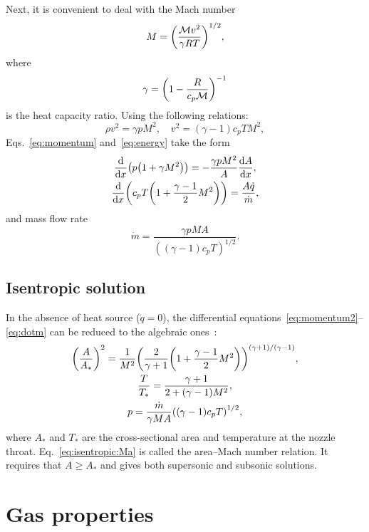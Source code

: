 \documentclass{article}
\begin{document}
Next, it is convenient to deal with the Mach number
\begin{equation}\label{eq:Mach}
    M = \qty(\frac{\mathcal{M}v^2}{\gamma RT})^{1/2},
\end{equation}
where
\begin{equation}\label{eq:gamma}
    \gamma = \qty(1-\frac{R}{c_p\mathcal{M}})^{-1}
\end{equation}
is the heat capacity ratio.
Using the following relations:
\begin{equation*}
    \rho v^2 = \gamma p M^2, \quad v^2 = (\gamma-1)c_pT M^2,
\end{equation*}
Eqs.~\eqref{eq:momentum} and~\eqref{eq:energy} take the form
\begin{gather}
    \dv{x}(p\qty(1 + \gamma M^2)) = -\frac{\gamma p M^2}{A}\dv{A}{x}, \label{eq:momentum2}\\
    \dv{x}(c_pT\qty(1 + \frac{\gamma-1}{2}M^2)) = \frac{A\dot{q}}{\dot{m}}, \label{eq:energy2}
\end{gather}
and mass flow rate
\begin{equation}\label{eq:dotm}
    \dot{m} = \frac{\gamma pMA}{((\gamma-1)c_pT)^{1/2}}.
\end{equation}

\subsection{Isentropic solution}

In the absence of heat source ($\dot{q}=0$), the differential equations~\eqref{eq:momentum2}--\eqref{eq:dotm}
can be reduced to the algebraic ones~\cite[Sec.~5.4]{anderson1990modern}:
\begin{gather}
    \qty(\frac{A}{A_*})^2 = \frac1{M^2}
        \qty(\frac{2}{\gamma+1}\qty(1+\frac{\gamma-1}{2}M^2))^{(\gamma+1)/(\gamma-1)}, \label{eq:isentropic:Ma}\\
    \frac{T}{T_*} = \frac{\gamma+1}{2 + (\gamma-1)M^2}, \label{eq:isentropic:T}\\
    p = \frac{\dot{m}}{\gamma MA}\qty((\gamma-1)c_pT)^{1/2}, \label{eq:isentropic:P}
\end{gather}
where $A_*$ and $T_*$ are the cross-sectional area and temperature at the nozzle throat.
Eq.~\eqref{eq:isentropic:Ma} is called the area--Mach number relation.
It requires that $A\geq A_*$ and gives both supersonic and subsonic solutions.

\section{Gas properties}
\end{document}
